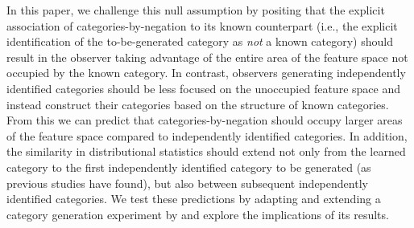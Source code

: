 \documentclass[10pt,letterpaper]{article}
\begin{document}
In this paper, we challenge this null assumption by positing that the explicit association of categories-by-negation to its known counterpart (i.e., the explicit identification of the to-be-generated category as \emph{not} a known category) should result in the observer taking advantage of the entire area of the feature space not occupied by the known category. In contrast, observers generating independently identified categories should be less focused on the unoccupied feature space and instead construct their categories based on the structure of known categories. From this we can predict that categories-by-negation should occupy larger areas of the feature space compared to independently identified categories. In addition, the similarity in distributional statistics should extend not only from the learned category to the first independently identified category to be generated (as previous studies have found), but also between subsequent independently identified categories. We test these predictions by adapting and extending a category generation experiment by  and explore the implications of its results.







\end{document}
